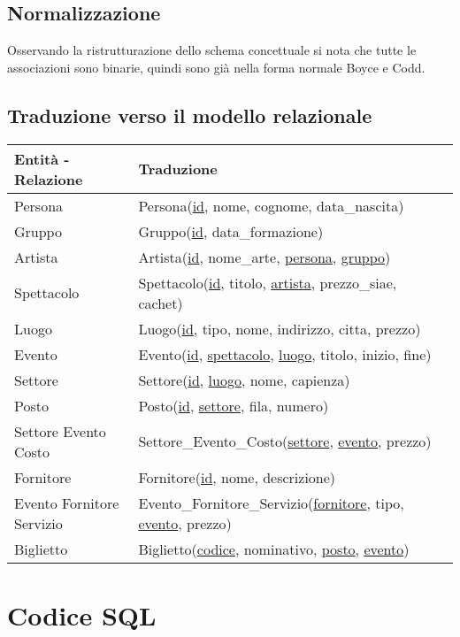 \documentclass[a4paper,11pt]{article}
\begin{document}
\subsection{Normalizzazione}
Osservando la ristrutturazione dello schema concettuale si nota che tutte le
associazioni sono binarie, quindi sono già nella forma normale Boyce e Codd.

\subsection{Traduzione verso il modello relazionale}

\begin{tabularx}{\textwidth}{|X|>{\raggedright\arraybackslash}X|>{\raggedright\arraybackslash}X|}
\hline
  \textbf{Entità - Relazione} & \textbf{Traduzione}\\
\hline
  Persona & Persona(\underline{id}, nome, cognome, data\_nascita) \\
\hline
  Gruppo & Gruppo(\underline{id}, data\_formazione) \\
\hline
  Artista & Artista(\underline{id}, nome\_arte, \underline{persona}, \underline{gruppo}) \\
\hline
  Spettacolo & Spettacolo(\underline{id}, titolo, \underline{artista}, prezzo\_siae, cachet) \\
\hline
  Luogo & Luogo(\underline{id}, tipo, nome, indirizzo, citta, prezzo) \\
\hline
  Evento & Evento(\underline{id}, \underline{spettacolo}, \underline{luogo}, titolo, inizio, fine) \\
\hline
  Settore & Settore(\underline{id}, \underline{luogo}, nome, capienza) \\
\hline
  Posto & Posto(\underline{id}, \underline{settore}, fila, numero) \\
\hline
  Settore Evento Costo & Settore\_Evento\_Costo(\underline{settore}, \underline{evento}, prezzo) \\
\hline
  Fornitore & Fornitore(\underline{id}, nome, descrizione) \\
\hline
  Evento Fornitore Servizio & Evento\_Fornitore\_Servizio(\underline{fornitore}, tipo, \underline{evento}, prezzo) \\
\hline
  Biglietto & Biglietto(\underline{codice}, nominativo, \underline{posto}, \underline{evento}) \\
\hline
\end{tabularx}

\section{Codice SQL}
\end{document}
